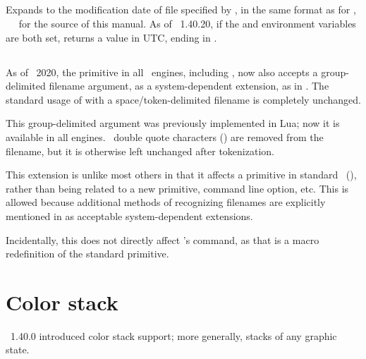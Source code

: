\documentclass{pdftexmanual}
\begin{document}
\subsection{}

Expands to the modification date of file specified by , in the same format as for , \eg\ {\tt
{}} for the source of this manual. As of
\PDFTEX\ 1.40.20, if the  and
 environment variables are both set,
 returns a value in UTC, ending in .

\subsection{}

As of \TEXLIVE\ 2020, the  primitive in all \TEX\ engines,
including \PDFTEX, now also accepts a group-delimited filename argument,
as a system-dependent extension, as in
\Lbrace{}\Rbrace. The standard usage of 
with a space/token-delimited filename is completely unchanged.

This group-delimited argument was previously implemented in Lua\TEX; now
it is available in all engines. \ASCII\ double quote characters
() are removed from the filename, but it is otherwise left
unchanged after tokenization.

This extension is unlike most others in that it affects a primitive in
standard \TEX\ (), rather than being related to a new
primitive, command line option, etc. This is allowed because additional
methods of recognizing filenames are explicitly mentioned in
 as acceptable system-dependent extensions.

Incidentally, this does not directly affect \LATEX's 
command, as that is a macro redefinition of the standard 
primitive.


\section{Color stack}

\PDFTEX\ 1.40.0 introduced color stack support; more generally, stacks
of any graphic state.
\end{document}
